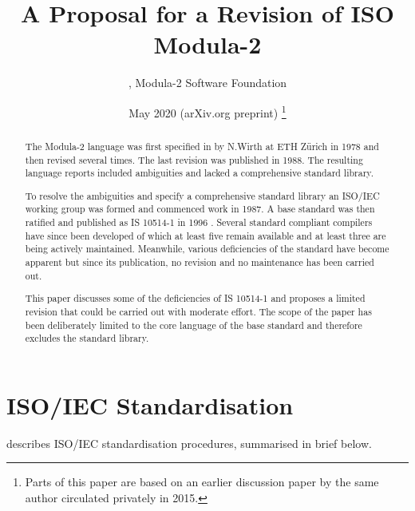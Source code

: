\documentclass[10pt,a4paper,leqno,fleqn]{article}
\title{A Proposal for a Revision of ISO Modula-2}
\author{\BK, Modula-2 Software Foundation}
\date{\small{May 2020 (arXiv.org preprint)
\footnote{Parts of this paper are based on an earlier discussion
paper by the same author circulated privately in 2015.}}}
\makeatletter
\newcommand{\verbatimfont}[1]{\def\verbatim@font{#1}}
\makeatother
\begin{document}
\verbatimfont{\small\fontfamily{lmtt}\selectfont}
\maketitle

\begin{abstract}

The Modula-2 language was first specified in \cite{Wirth78} by N.Wirth at
\Gls{ETH} Z\"{u}rich in 1978 and then revised several times. The last revision
\cite{Wirth88} was published in 1988. The resulting language reports included
ambiguities and lacked a comprehensive standard library.

To resolve the ambiguities and specify a comprehensive standard library an
ISO/IEC working group was formed and commenced work in 1987. A base
standard was then ratified and published as IS 10514-1 in 1996 \cite{ISO96}.
Several standard compliant compilers have since been developed of which at
least five remain available and at least three are being actively maintained.
Meanwhile, various deficiencies of the standard have become apparent but
since its publication, no revision and no maintenance has been carried out.

This paper discusses some of the deficiencies of IS 10514-1 and proposes a
limited revision that could be carried out with moderate effort. The scope of the
paper has been deliberately limited to the core language of the base standard
and therefore excludes the standard library.

\end{abstract}


\section{ISO/IEC Standardisation}

\cite{II2020} describes ISO/IEC standardisation procedures, summarised in
brief below.

\end{document}

